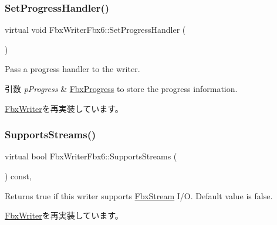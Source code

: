 \mbox{\label{class_fbx_writer_fbx6_a3877fb079da98f7883ec977a5fe206f1}} 
\subsubsection{\texorpdfstring{Set\+Progress\+Handler()}{SetProgressHandler()}}
{\footnotesize\ttfamily virtual void Fbx\+Writer\+Fbx6\+::\+Set\+Progress\+Handler (\begin{DoxyParamCaption}\item[{\hyperlink{class_fbx_progress}{Fbx\+Progress} $\ast$}]{ }\end{DoxyParamCaption})\hspace{0.3cm}{\ttfamily [virtual]}}

Pass a progress handler to the writer. 
\begin{DoxyParams}{引数}
{\em p\+Progress} & \hyperlink{class_fbx_progress}{Fbx\+Progress} to store the progress information. \\
\hline
\end{DoxyParams}


\hyperlink{class_fbx_writer_a1a3cf241a0c11364981ebd23be59fd8f}{Fbx\+Writer}を再実装しています。

\mbox{\label{class_fbx_writer_fbx6_a74bc2a2a859a59118567ac2d0a471ef7}} 
\subsubsection{\texorpdfstring{Supports\+Streams()}{SupportsStreams()}}
{\footnotesize\ttfamily virtual bool Fbx\+Writer\+Fbx6\+::\+Supports\+Streams (\begin{DoxyParamCaption}{ }\end{DoxyParamCaption}) const\hspace{0.3cm}{\ttfamily [inline]}, {\ttfamily [virtual]}}

Returns true if this writer supports \hyperlink{class_fbx_stream}{Fbx\+Stream} I/O. Default value is false. 

\hyperlink{class_fbx_writer_aa79a285227d113ee6d64aee6a84986cd}{Fbx\+Writer}を再実装しています。



